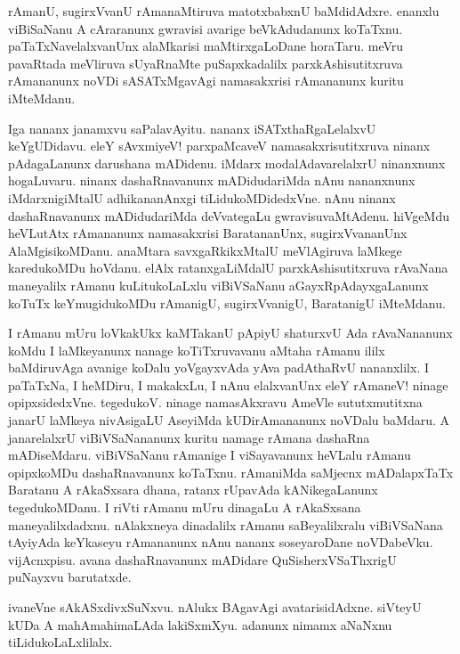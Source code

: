 \begin{mng}
rAmanU, sugirxVvanU rAmanaMtiruva matotxbabxnU baMdidAdxre. enanxlu viBiSaNanu A cAraranunx gwravisi avarige beVkAdudanunx koTaTxnu. paTaTxNavelalxvanUnx alaMkarisi maMtirxgaLoDane horaTaru. meVru pavaRtada meVliruva sUyaRnaMte puSapxkadalilx parxkAshisutitxruva rAmananunx noVDi sASATxMgavAgi namasakxrisi rAmananunx kuritu iMteMdanu.
\end{mng}

\begin{mng}
Iga nananx janamxvu saPalavAyitu. nananx iSATxthaRgaLelalxvU keYgUDidavu. eleY sAvxmiyeV! parxpaMcaveV namasakxrisutitxruva ninanx pAdagaLanunx darushana mADidenu. iMdarx modalAdavarelalxrU ninanxnunx hogaLuvaru. ninanx dashaRnavanunx mADidudariMda nAnu nananxnunx iMdarxnigiMtalU adhikananAnxgi tiLidukoMDidedxVne. nAnu ninanx dashaRnavanunx mADidudariMda deVvategaLu gwravisuvaMtAdenu. hiVgeMdu heVLutAtx rAmananunx namasakxrisi BaratananUnx, sugirxVvananUnx AlaMgisikoMDanu. anaMtara savxgaRkikxMtalU meVlAgiruva laMkege karedukoMDu hoVdanu. elAlx ratanxgaLiMdalU parxkAshisutitxruva rAvaNana maneyalilx rAmanu kuLitukoLaLxlu viBiVSaNanu aGayxRpAdayxgaLanunx koTuTx keYmugidukoMDu rAmanigU, sugirxVvanigU, BaratanigU iMteMdanu.
\end{mng}

\begin{mng}
I rAmanu mUru loVkakUkx kaMTakanU pApiyU shaturxvU Ada rAvaNananunx koMdu I laMkeyanunx nanage koTiTxruvavanu aMtaha rAmanu ililx baMdiruvAga avanige koDalu yoVgayxvAda yAva padAthaRvU nananxlilx. I paTaTxNa, I heMDiru, I makakxLu, I nAnu elalxvanUnx eleY rAmaneV! ninage opipxsidedxVne. tegedukoV. ninage namasAkxravu AmeVle sututxmutitxna janarU laMkeya nivAsigaLU AseyiMda kUDirAmananunx noVDalu baMdaru. A janarelalxrU viBiVSaNananunx kuritu namage rAmana dashaRna mADiseMdaru. viBiVSaNanu rAmanige I viSayavanunx heVLalu rAmanu opipxkoMDu dashaRnavanunx koTaTxnu. rAmaniMda saMjecnx mADalapxTaTx Baratanu A rAkaSxsara dhana, ratanx rUpavAda kANikegaLanunx tegedukoMDanu. I riVti rAmanu mUru dinagaLu A rAkaSxsana maneyalilxdadxnu. nAlakxneya dinadalilx rAmanu saBeyalilxralu viBiVSaNana tAyiyAda keYkaseyu rAmananunx nAnu nananx soseyaroDane noVDabeVku. vijAcnxpisu. avana dashaRnavanunx mADidare QuSisherxVSaThxrigU puNayxvu barutatxde. 
\end{mng}

\begin{mng}
ivaneVne sAkASxdivxSuNxvu. nAlukx BAgavAgi avatarisidAdxne. siVteyU kUDa A mahAmahimaLAda lakiSxmXyu. adanunx nimamx aNaNxnu tiLidukoLaLxlilalx.
\end{mng}

